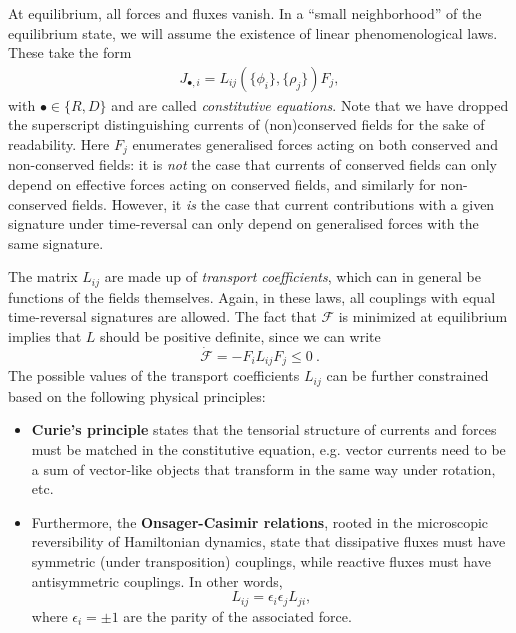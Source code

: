 At equilibrium, all forces and fluxes vanish.
In a ``small neighborhood'' of the equilibrium state, we will assume the existence of linear phenomenological laws.
These take the form
%
\begin{align}
    J_{\bullet,i}
    = L_{ij}(\{\phi_i\}, \{\rho_j\}) F_j, 
\end{align}
%
with $\bullet \in \{R,D\}$ and are called \emph{constitutive equations}. Note that we have dropped the superscript distinguishing currents of (non)conserved fields for the sake of readability.
Here $F_j$ enumerates generalised forces acting on both conserved and non-conserved fields: it is \emph{not} the case that currents of conserved fields can only depend on effective forces acting on conserved fields, and similarly for non-conserved fields. However, it \emph{is} the case that current contributions with a given signature under time-reversal can only depend on generalised forces with the same signature. 

The matrix $L_{ij}$ are made up of \emph{transport coefficients}, which can in general be functions of the fields themselves.
Again, in these laws, all couplings with equal time-reversal signatures are allowed.
The fact that $\mathcal{F}$ is minimized at equilibrium implies that $L$ should be positive definite, since we can write
\begin{equation}
    \dot{\mathcal{F}} = - F_i L_{ij} F_j \leq 0~.
\end{equation}
The possible values of the transport coefficients $L_{ij}$ can be further constrained based on the following physical principles:
\begin{itemize}
    \item {\bf Curie's principle} states that the tensorial structure of currents and forces must be matched in the constitutive equation, e.g. vector currents need to be a sum of vector-like objects that transform in the same way under rotation, etc.
    \item Furthermore, the {\bf  Onsager-Casimir relations}, rooted in the microscopic reversibility of Hamiltonian dynamics, state that dissipative fluxes must have symmetric (under transposition) couplings, while reactive fluxes must have antisymmetric couplings.
    In other words,
    \begin{equation}
        L_{ij}  = \epsilon_i \epsilon_j L_{ji},
    \end{equation}
    where $\epsilon_i = \pm 1$ are the parity of the associated force.
\end{itemize}

